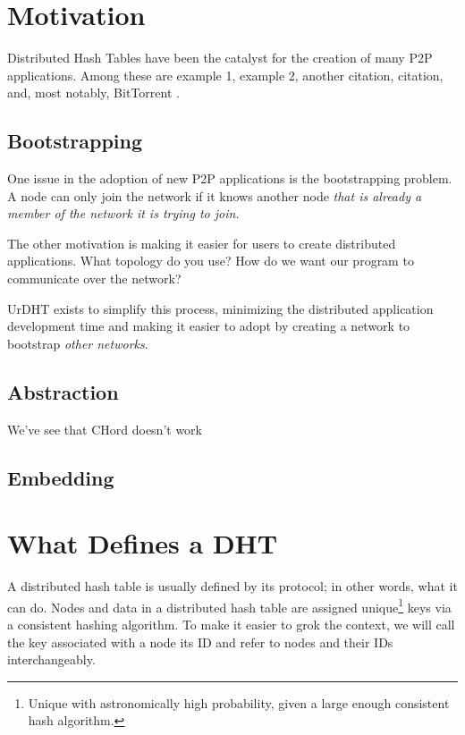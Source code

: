 \documentclass[11pt,conference]{IEEEtran}
\begin{document}
\section{Motivation}
\label{sec:motivation}

Distributed Hash Tables have been the catalyst for the creation of many P2P applications.
Among these are example 1, example 2, another citation, citation, and, most notably, BitTorrent \cite{bittorrent}.  %


\subsection{Bootstrapping}
One issue in the adoption of new P2P applications is the bootstrapping problem.
A node can only join the network if it knows another node \textit{that is already a member of the network it is trying to join.}


The other motivation is making it easier for users to create distributed applications.
What topology do you use?
How do we want our program to communicate over the network?


UrDHT exists to simplify this process, minimizing the distributed application development time and making it easier to adopt by creating a network to bootstrap \textit{other networks}.


\subsection{Abstraction}

We've see that CHord doesn't work


\subsection{Embedding}


\section{What Defines a DHT}
\label{sec:define}

A distributed hash table is usually defined by its protocol; in other words, what it can do.
Nodes and data in a distributed hash table are assigned unique\footnote{Unique with astronomically high probability, given a large enough consistent hash algorithm.} keys via a consistent hashing algorithm.
To make it easier to grok the context, we will call the key associated with a node its ID and refer to  nodes and their IDs interchangeably.
\end{document}
